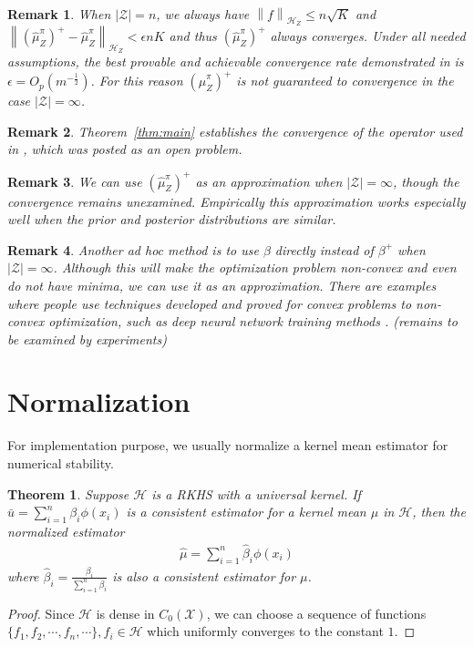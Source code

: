 \documentclass[a4paper]{article}
\renewcommand{\cal}{\mathcal}
\newcommand{\norm}[1]{\left\lVert#1\right\rVert}
\newtheorem{theorem}{Theorem}
\newtheorem{remark}{Remark}
\newcommand{\thmref}[1]{Theorem~\ref{#1}}
\begin{document}
\begin{remark}
When $|\cal{Z}| = n$, we always have $\norm{f}_{\cal{H}_Z} \leq n\sqrt{K}$ and $\norm{(\widehat{\mu}_Z^\pi)^+ - \widehat{\mu}_Z^\pi}_{\cal{H}_Z} < \epsilon n K$ and thus $(\widehat{\mu}_Z^\pi)^+$ always converges. Under all needed assumptions, the best provable and achievable convergence rate demonstrated in \cite{fukumizu2011kernel} is $\epsilon = O_p(m^{-\frac{1}{2}})$. For this reason $(\widehat{\mu}_Z^\pi)^+$ is not guaranteed to convergence in the case $|\cal{Z}| = \infty$.
\end{remark}
\begin{remark}
\thmref{thm:main} establishes the convergence of the operator used in \cite{nishiyama2012hilbert}, which was posted as an open problem.
\end{remark}
\begin{remark}
We can use $(\widehat{\mu}_Z^\pi)^+$ as an approximation when $|\cal{Z}| = \infty$, though the convergence remains unexamined. Empirically this approximation works especially well when the prior and posterior distributions are similar.
\end{remark}
\begin{remark}
Another ad hoc method is to use $\beta$ directly instead of $\beta^+$ when $|\cal{Z}| = \infty$. Although this will make the optimization problem non-convex and even do not have minima, we can use it as an approximation. There are examples where people use techniques developed and proved for convex problems to non-convex optimization, such as deep neural network training methods \cite{nesterov1983method}\cite{duchi2011adaptive}. ({\color{red}remains to be examined by experiments})
\end{remark}
\section{Normalization}
For implementation purpose, we usually normalize a kernel mean estimator for numerical stability.
\begin{theorem}
Suppose $\cal{H}$ is a RKHS with a universal kernel. If $\bar{u} = \sum_{i=1}^n \beta_i \phi(x_i)$ is a consistent estimator for a kernel mean $\mu$ in $\cal{H}$, then the normalized estimator
\begin{align}
\hat{\mu} = \sum_{i=1}^n \hat{\beta}_i \phi(x_i)
\end{align}
where $\hat{\beta}_i = \frac{\beta_i}{\sum_{i=1}^n \beta_i}$ is also a consistent estimator for $\mu$.
\end{theorem}
\begin{proof}
Since $\cal{H}$ is dense in $C_0(\cal{X})$, we can choose a sequence of functions $\{f_1,f_2,\cdots,f_n,\cdots\}, f_i \in \cal{H}$ which uniformly converges to the constant $1$. 
\end{proof}
\end{document}
